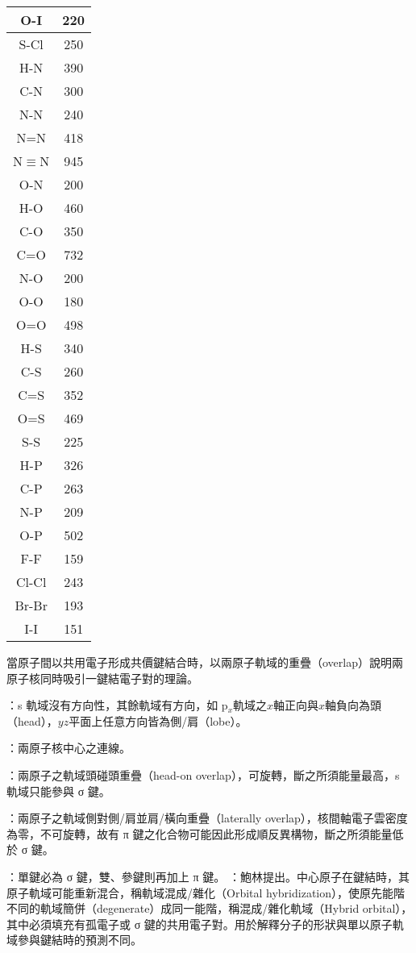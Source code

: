 \documentclass[a4paper,12pt]{report}
\begin{document}
\begin{longtable}[c]{|c|c|}
O-I & 220\\\hline
S-Cl & 250\\\hline
H-N & 390\\\hline
C-N & 300\\\hline
N-N & 240\\\hline
N=N & 418\\\hline
N$\equiv$N & 945\\\hline
O-N & 200\\\hline
H-O & 460\\\hline
C-O & 350\\\hline
C=O & 732\\\hline
N-O & 200\\\hline
O-O & 180\\\hline
O=O & 498\\\hline
H-S & 340\\\hline
C-S & 260\\\hline
C=S & 352\\\hline
O=S & 469\\\hline
S-S & 225\\\hline
H-P & 326\\\hline
C-P & 263\\\hline
N-P& 209\\\hline
O-P & 502\\\hline
F-F & 159\\\hline
Cl-Cl & 243\\\hline
Br-Br & 193\\\hline
I-I & 151\\\hline
\end{longtable}
\FloatBarrier
{}
當原子間以共用電子形成共價鍵結合時，以兩原子軌域的重疊（overlap）說明兩原子核同時吸引一鍵結電子對的理論。
\bit
\item {}：s 軌域沒有方向性，其餘軌域有方向，如 p$_x$軌域之$x$軸正向與$x$軸負向為頭（head），$yz$平面上任意方向皆為側/肩（lobe）。
\item {}：兩原子核中心之連線。
\item {}：兩原子之軌域頭碰頭重疊（head-on overlap），可旋轉，斷之所須能量最高，s 軌域只能參與 σ 鍵。
\item  {}：兩原子之軌域側對側/肩並肩/橫向重疊（laterally overlap），核間軸電子雲密度為零，不可旋轉，故有 π 鍵之化合物可能因此形成順反異構物，斷之所須能量低於 σ 鍵。
\item {}：單鍵必為 σ 鍵，雙、參鍵則再加上 π 鍵。
\eit
{}
：鮑林提出。中心原子在鍵結時，其原子軌域可能重新混合，稱軌域混成/雜化（Orbital hybridization），使原先能階不同的軌域簡併（degenerate）成同一能階，稱混成/雜化軌域（Hybrid orbital），其中必須填充有孤電子或 σ 鍵的共用電子對。用於解釋分子的形狀與單以原子軌域參與鍵結時的預測不同。
\end{document}

